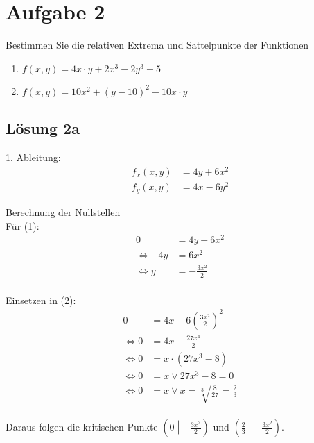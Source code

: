 \documentclass[main.tex]{subfiles}
\begin{document}
\section{Aufgabe 2}

Bestimmen Sie die relativen Extrema und Sattelpunkte der Funktionen

\begin{enumerate}
    \item $f(x,y) = 4x\cdot y +2x^3 -2y^3 +5$
    \item $f(x,y) = 10x^2 + (y-10)^2 -10x \cdot y$
\end{enumerate}

\subsection{Lösung 2a}
\underline{1. Ableitung}:
\begin{align}
    f_x(x,y) &= 4y + 6x^2 \\
    f_y(x,y) &= 4x - 6y^2
\end{align}

\underline{Berechnung der Nullstellen}\\

Für (1):
\begin{align*}
                    0   & = 4y + 6x^2 \\
    \Leftrightarrow -4y & = 6x^2 \\
    \Leftrightarrow y   & = - \frac{3x^2}{2} \\
\end{align*}

Einsetzen in (2):
\begin{align*}
                        0 &= 4x - 6\left(\frac{3x^2}{2}\right)^2 \\
    \Leftrightarrow     0 &= 4x - \frac{27x^4}{2} \\
    \Leftrightarrow     0 &= x \cdot (27x^3 - 8) \\
    \Leftrightarrow     0 &= x \vee 27x^3 - 8 = 0 \\
    \Leftrightarrow     0 &= x \vee x = \sqrt[3]{\frac{8}{27}} = \frac{2}{3}\\
\end{align*}

Daraus folgen die kritischen Punkte $\left(0 \middle| -\frac{3x^2}{2}\right)$ und $\left(\frac{2}{3} \middle|- \frac{3x^2}{2}\right)$.
\end{document}
